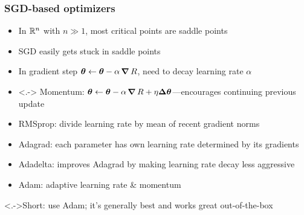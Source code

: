 \begin{frame}
    \frametitle{SGD-based optimizers}
    \begin{itemize}
        \item In $\mathbb{R}^n$ with $n \gg 1$, most critical points are saddle points
        \item SGD easily gets stuck in saddle points
        \item In gradient step $\bm{\theta} \leftarrow \bm{\theta} - \alpha \operatorname{\bm{\nabla}} R$, need to decay learning rate $\alpha$
    \end{itemize}

    \begin{itemize}[<+->]
        \item<.-> Momentum: $\bm{\theta} \leftarrow \bm{\theta} - \alpha \operatorname{\bm{\nabla}} R + \eta \mathbf{\Delta}\bm{\theta}$---encourages continuing previous update \citep{RumelhartNature86}
        \item RMSprop: divide learning rate by mean of recent gradient norms \citep{TielemanRMSProp}
        \item Adagrad: each parameter has own learning rate determined by its gradients \citep{DuchJMLR11}
        \item Adadelta: improves Adagrad by making learning rate decay less aggressive \citep{Zeiler12}
        \item \alert<+->{Adam}: adaptive learning rate \& momentum \citep{KingmaICLR15}
    \end{itemize}

    \uncover<.->{Short: use Adam; it's generally best and works great out-of-the-box}
\end{frame}

